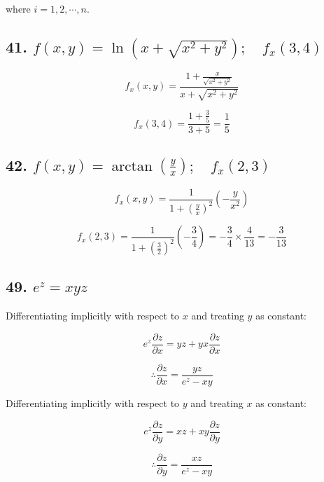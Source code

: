 \documentclass{article}
\begin{document}
    where $i = 1, 2, \cdots, n$.

    \subsection*{41. $f(x, y) = \ln (x + \sqrt{x^2 + y^2}); \quad f_x(3, 4)$}

    $$f_x(x, y) = \frac{1 + \frac{x}{\sqrt{x^2 + y^2}}}{x + \sqrt{x^2 + y^2}}$$

    $$f_x(3, 4) = \frac{1 + \frac 3 5}{3 + 5} = \frac{1}{5}$$

    \subsection*{42. $f(x, y) = \arctan(\frac y x); \quad f_x(2, 3)$}

    $$f_x(x, y) = \frac{1}{1 + (\frac{y}{x})^2} (-\frac{y}{x^2})$$

    $$f_x(2, 3) = \frac{1}{1 + (\frac 3 2)^2}(-\frac{3}{4}) = -\frac 3 4 \times \frac{4}{13} = -\frac{3}{13}$$

    \subsection*{49. $e^z = xyz$}






    Differentiating implicitly with respect to $x$ and treating $y$ as constant:

    $$e^z \frac{\partial z}{\partial x} = yz + yx\frac{\partial z}{\partial x}$$

    $$\therefore \frac{\partial z}{\partial x} = \frac{yz}{e^z - xy}$$

    Differentiating implicitly with respect to $y$ and treating $x$ as constant:

    $$e^z \frac{\partial z}{\partial y} = xz + xy\frac{\partial z}{\partial y}$$

    $$\therefore \frac{\partial z}{\partial y} = \frac{xz}{e^z - xy}$$
\end{document}
